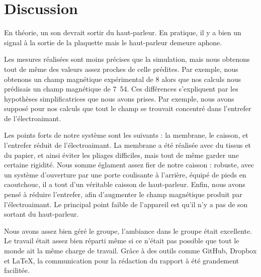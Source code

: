 

\section{Discussion}

En théorie, un son devrait sortir du haut-parleur.  En pratique, il y a bien un signal
à la sortie de la plaquette mais le haut-parleur demeure aphone. 

Les mesures réalisées sont moins précises que la simulation, mais nous obtenons tout de même 
des valeurs assez proches de celle prédites.  Par exemple, nous obtenons un champ magnétique
expérimental de \unit{8}{\centi\tesla} alors que nos calculs nous prédisais un champ magnétique de
\unit{7.54}{\centi\tesla}. Ces différences s'expliquent par les hypothèses simplificatrices
que nous avons prises. Par exemple, nous avons supposé pour nos calculs que tout le champ se trouvait 
concentré dans l'entrefer de l'électroaimant.

Les points forts de notre système sont les suivants : la membrane, le caisson, et l'entrefer réduit de l'électroaimant. 
La membrane a été réalisée avec du tissus et du papier, et ainsi éviter les pliages difficiles, mais tout de même garder 
une certaine rigidité. Nous somme églament assez fier de notre caisson : robuste, avec un système d'ouverture par une porte
coulisante à l'arrière, équipé de pieds en caoutchouc, il a tout d'un véritable caisson de haut-parleur. Enfin, nous avons 
pensé à réduire l'entrefer, afin d'augmenter le champ magnétique produit par l'électroaimant. Le principal point faible de 
l'appareil est qu'il n'y a pas de son sortant du haut-parleur.

Nous avons assez bien géré le groupe, l'ambiance dans le groupe était excellente. Le travail était assez bien réparti
même si ce n'était pas possible que tout le monde ait la même charge de travail. Grâce à des outils comme GitHub, Dropbox et 
\LaTeX, la communication pour la rédaction du rapport à été grandement facilitée.


